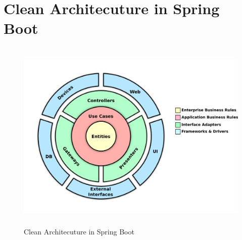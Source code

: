 %	
%

\section{Clean Architecuture in Spring Boot} \label{a.2.cleanArchitecture}
\begin{figure}[h]
	\centering
	\includegraphics[height=350px]{./zfiles/Bilder/cleanArchitecture.png}
	\caption{Clean Architecuture in Spring Boot \cite{cleanArchitecture.medium}}
	\label{a.2.cleanArchitecture}
\end{figure}

\newpage